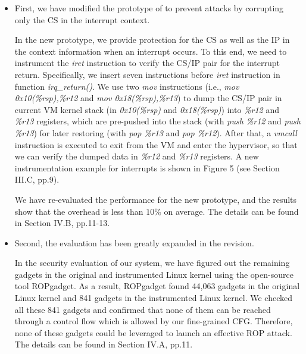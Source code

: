 \documentclass[oneside, 11pt]{article}
\begin{document}
\begin{itemize}

\item %
\noindent
First, we have modified the prototype of \TheName{} to prevent attacks by
corrupting only the CS in the interrupt context.

In the new prototype,
we provide protection for the CS as well as the IP in the context information
when an interrupt occurs. To this end, we need to instrument the \emph{iret}
instruction to verify the CS/IP pair for the interrupt return. Specifically,
we insert seven instructions before \emph{iret} instruction
in function \emph{irq\_return()}. We use two \emph{mov} instructions
(i.e., \emph{mov 0x10(\%rsp),\%r12} and \emph{mov 0x18(\%rsp),\%r13}) to dump
the CS/IP pair in current VM kernel stack (in \emph{0x10(\%rsp)} and \emph{0x18(\%rsp)})
into \emph{\%r12} and \emph{\%r13} registers, which are pre-pushed into the
stack (with \emph{push \%r12} and \emph{push \%r13}) for later restoring
(with \emph{pop \%r13} and \emph{pop \%r12}). After that, a \emph{vmcall}
instruction is executed to exit from the VM and enter the hypervisor, so that
we can verify the dumped data in \emph{\%r12} and \emph{\%r13} registers.
A new instrumentation example for interrupts is shown in
Figure 5 (see Section III.C, pp.9).

We have re-evaluated the performance for the new prototype, and the
results show that the overhead is less than $10$\% on average.
The details can be found in Section IV.B, pp.11-13.

\item %
Second, the evaluation has been greatly expanded in the revision.

In the security evaluation of our system, we have figured out the
remaining gadgets in the original and instrumented Linux kernel
using the open-source tool ROPgadget. As a result, ROPgadget found
44,063 gadgets in the original Linux kernel and 841 gadgets in the
instrumented Linux kernel. We checked all these 841 gadgets and
confirmed that none of them can be reached through a control flow
which is allowed by our fine-grained CFG. Therefore, none of these
gadgets could be leveraged to launch an effective ROP attack.
The details can be found in Section IV.A, pp.11.


\end{itemize}
\end{document}
